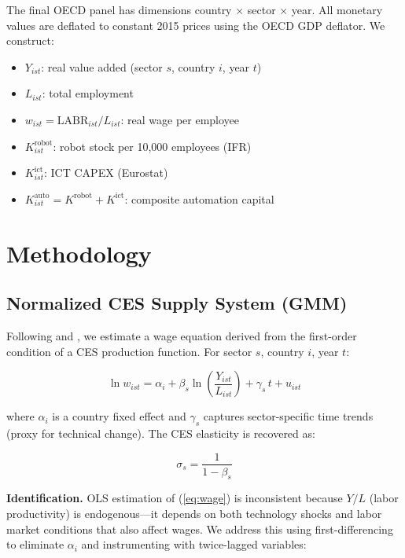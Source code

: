 \documentclass[11pt,a4paper]{article}
\begin{document}
The final OECD panel has dimensions country $\times$ sector $\times$ year.
All monetary values are deflated to constant 2015 prices using the OECD GDP deflator.
We construct:
\begin{itemize}
    \item $Y_{ist}$: real value added (sector $s$, country $i$, year $t$)
    \item $L_{ist}$: total employment
    \item $w_{ist} = \text{LABR}_{ist} / L_{ist}$: real wage per employee
    \item $K_{ist}^{\text{robot}}$: robot stock per 10,000 employees (IFR)
    \item $K_{ist}^{\text{ict}}$: ICT CAPEX (Eurostat)
    \item $K_{ist}^{\text{auto}} = K^{\text{robot}} + K^{\text{ict}}$: composite automation capital
\end{itemize}


\section{Methodology}
\label{sec:methodology}

\subsection{Normalized CES Supply System (GMM)}

Following \autocite{leonledesma2010identifying} and \autocite{klump2012normalization}, we estimate a wage equation derived from the first-order condition of a CES production function.
For sector $s$, country $i$, year $t$:

\begin{equation}
\ln w_{ist} = \alpha_i + \beta_s \ln\left(\frac{Y_{ist}}{L_{ist}}\right) + \gamma_s \, t + u_{ist}
\label{eq:wage}
\end{equation}

where $\alpha_i$ is a country fixed effect and $\gamma_s$ captures sector-specific time trends (proxy for technical change).
The CES elasticity is recovered as:

\begin{equation}
\sigma_s = \frac{1}{1 - \beta_s}
\label{eq:sigma}
\end{equation}

\textbf{Identification.}
OLS estimation of (\ref{eq:wage}) is inconsistent because $Y/L$ (labor productivity) is endogenous---it depends on both technology shocks and labor market conditions that also affect wages.
We address this using first-differencing to eliminate $\alpha_i$ and instrumenting with twice-lagged variables:
\end{document}
